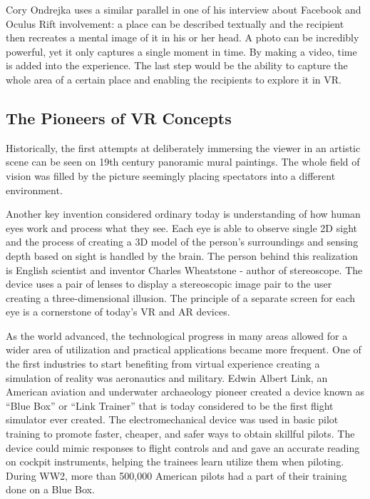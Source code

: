 \documentclass[12pt, a4paper]{article}
\begin{document}
Cory Ondrejka uses a similar parallel in one of his interview about Facebook and Oculus Rift involvement: a place can be described textually and the recipient then recreates a mental image of it in his or her head. A photo can be incredibly powerful, yet it only captures a single moment in time. By making a video, time is added into the experience. The last step would be the ability to capture the whole area  of a certain place and enabling the recipients to explore it in VR.

\subsection{The Pioneers of VR Concepts}
Historically, the first attempts at deliberately immersing the viewer in an artistic scene can be seen on 19th century panoramic mural paintings. The whole field of vision was filled by the picture seemingly placing spectators into a different environment.

Another key invention considered ordinary today is understanding of how human eyes work and process what they see. Each eye is able to observe single 2D sight and the process of creating a 3D model of the person’s surroundings and sensing depth based on sight is handled by the brain. The person behind this realization is English scientist and inventor Charles Wheatstone - author of stereoscope. The device uses a pair of lenses to display a stereoscopic image pair to the user creating a three-dimensional illusion. The principle of a separate screen for each eye is a cornerstone of today’s VR and AR devices.

As the world advanced, the technological progress in many areas allowed for a wider area of utilization and practical applications became more frequent. One of the first industries to start benefiting from virtual experience creating a simulation of reality was aeronautics and military. Edwin Albert Link, an American aviation and underwater archaeology pioneer created a device known as “Blue Box” or “Link Trainer” that is today considered to be the first flight simulator ever created. The electromechanical device was used in basic pilot training to promote faster, cheaper, and safer ways to obtain skillful pilots. The device could mimic responses to flight controls and and gave an accurate reading on cockpit instruments, helping the trainees learn utilize them when piloting. During WW2, more than 500,000 American  pilots had a part of their training done on a Blue Box.
\end{document}
